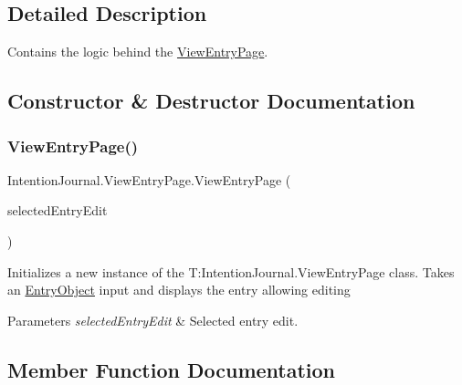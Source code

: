 \subsection{Detailed Description}
Contains the logic behind the \hyperlink{class_intention_journal_1_1_view_entry_page}{View\+Entry\+Page}. 



\subsection{Constructor \& Destructor Documentation}
\mbox{\label{class_intention_journal_1_1_view_entry_page_aee0c9a7d98ef81043797789095a4c9e9}} 
\subsubsection{\texorpdfstring{View\+Entry\+Page()}{ViewEntryPage()}}
{\footnotesize\ttfamily Intention\+Journal.\+View\+Entry\+Page.\+View\+Entry\+Page (\begin{DoxyParamCaption}\item[{\hyperlink{class_intention_journal_1_1_entry_object}{Entry\+Object}}]{selected\+Entry\+Edit }\end{DoxyParamCaption})\hspace{0.3cm}{\ttfamily [inline]}}



Initializes a new instance of the T\+:\+Intention\+Journal.\+View\+Entry\+Page class. Takes an \hyperlink{class_intention_journal_1_1_entry_object}{Entry\+Object} input and displays the entry allowing editing 


\begin{DoxyParams}{Parameters}
{\em selected\+Entry\+Edit} & Selected entry edit.\\
\hline
\end{DoxyParams}


\subsection{Member Function Documentation}
\mbox{\label{class_intention_journal_1_1_view_entry_page_a23b72c3c73f876955f1b4ba32fbcd7f6}} 
